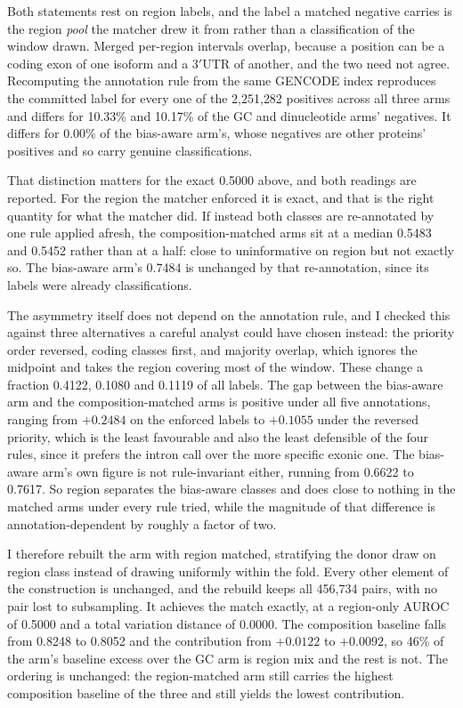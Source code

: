 Both statements rest on region labels, and the label a matched negative carries is the region
\emph{pool} the matcher drew it from rather than a classification of the window drawn. Merged
per-region intervals overlap, because a position can be a coding exon of one isoform and a
3$'$UTR of another, and the two need not agree. Recomputing the annotation rule from the same
GENCODE index reproduces the committed label for every one of the 2{,}251{,}282 positives across
all three arms and differs for 10.33\% and 10.17\% of the GC and dinucleotide arms' negatives.
It differs for 0.00\% of the bias-aware arm's, whose negatives are other proteins' positives and
so carry genuine classifications.

That distinction matters for the exact 0.5000 above, and both readings are reported. For the
region the matcher enforced it is exact, and that is the right quantity for what the matcher
did. If instead both classes are re-annotated by one rule applied afresh, the composition-matched
arms sit at a median 0.5483 and 0.5452 rather than at a half: close to
uninformative on region but not exactly so. The bias-aware arm's 0.7484 is unchanged by that
re-annotation, since its labels were already classifications.

The asymmetry itself does not depend on the annotation rule, and I checked this against three
alternatives a careful analyst could have chosen instead: the priority order reversed, coding
classes first, and majority overlap, which ignores the midpoint and takes the region covering
most of the window. These change a fraction 0.4122, 0.1080 and 0.1119 of all labels. The gap between the
bias-aware arm and the composition-matched arms is positive under all five annotations,
ranging from $+0.2484$ on the enforced labels to $+0.1055$ under the reversed priority, which is
the least favourable and also the least defensible of the four rules, since it prefers the
intron call over the more specific exonic one. The bias-aware arm's own figure is not
rule-invariant either, running from 0.6622 to 0.7617. So region separates the bias-aware classes
and does close to nothing in the matched arms under every rule tried, while the magnitude of
that difference is annotation-dependent by roughly a factor of two.

I therefore rebuilt the arm with region matched, stratifying the donor draw on region class
instead of drawing uniformly within the fold. Every other element of the construction is
unchanged, and the rebuild keeps all 456{,}734 pairs, with no pair lost to subsampling. It achieves the match exactly, at a region-only AUROC of 0.5000
and a total variation distance of 0.0000. The composition baseline falls from 0.8248 to 0.8052
and the contribution from $+0.0122$ to $+0.0092$, so 46\% of the arm's baseline excess over the
GC arm is region mix and the rest is not. The ordering is unchanged: the region-matched arm
still carries the highest composition baseline of the three and still yields the lowest
contribution.

